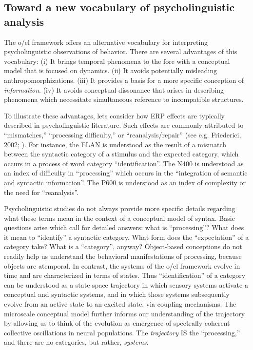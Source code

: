 \subsection{Toward a new vocabulary of psycholinguistic analysis}

The o/el framework offers an alternative vocabulary for interpreting psycholinguistic observations of behavior. There are several advantages of this vocabulary: (i) It brings temporal phenomena to the fore with a conceptual model that is focused on dynamics. (ii) It avoids potentially misleading anthropomorphizations. (iii) It provides a basis for a more specific conception of \textit{information}. (iv) It avoids conceptual dissonance that arises in describing phenomena which necessitate simultaneous reference to incompatible structures.

To illustrate these advantages, lets consider how ERP effects are typically described in psycholinguistic literature. Such effects are commonly attributed to “mismatches,” “processing difficulty,” or “reanalysis/repair” (see e.g. Friederici, 2002; \citealt{KutasFedermeier2011}). For instance, the ELAN is understood as the result of a mismatch between the syntactic category of a stimulus and the expected category, which occurs in a process of word category “identification”. The N400 is understood as an index of difficulty in “processing” which occurs in the “integration of semantic and syntactic information”. The P600 is understood as an index of complexity or the need for “reanalysis”.

Psycholinguistic studies do not always provide more specific details regarding what these terms mean in the context of a conceptual model of syntax. Basic questions arise which call for detailed answers: what is “processing”? What does it mean to “identify” a syntactic category. What form does the “expectation” of a category take? What is a “category”, anyway? Object-based conceptions do not readily help us understand the behavioral manifestations of processing, because objects are atemporal. In contrast, the systems of the o/el framework evolve in time and are characterized in terms of states. Thus “identification” of a category can be understood as a state space trajectory in which sensory systems activate a conceptual and syntactic systems, and in which those systems subsequently evolve from an active state to an excited state, via coupling mechanisms. The microscale conceptual model further informs our understanding of the trajectory by allowing us to think of the evolution as emergence of spectrally coherent collective oscillations in neural populations. The \textit{trajectory} IS the “processing,” and there are no categories, but rather, \textit{systems}.

